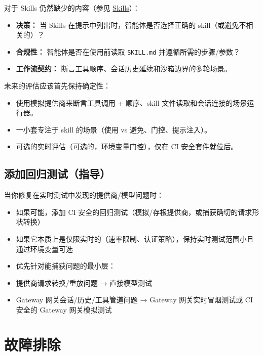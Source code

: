对于 Skills 仍然缺少的内容（参见 \href{/tools/skills}{Skills}）：

\begin{itemize}
  \item \textbf{决策：} 当 Skills 在提示中列出时，智能体是否选择正确的 skill（或避免不相关的）？
  \item \textbf{合规性：} 智能体是否在使用前读取 \texttt{SKILL.md} 并遵循所需的步骤/参数？
  \item \textbf{工作流契约：} 断言工具顺序、会话历史延续和沙箱边界的多轮场景。
\end{itemize}


未来的评估应该首先保持确定性：

\begin{itemize}
  \item 使用模拟提供商来断言工具调用 + 顺序、skill 文件读取和会话连接的场景运行器。
  \item 一小套专注于 skill 的场景（使用 vs 避免、门控、提示注入）。
  \item 可选的实时评估（可选的，环境变量门控），仅在 CI 安全套件就位后。
\end{itemize}


\subsection{添加回归测试（指导）}


当你修复在实时测试中发现的提供商/模型问题时：

\begin{itemize}
  \item 如果可能，添加 CI 安全的回归测试（模拟/存根提供商，或捕获确切的请求形状转换）
  \item 如果它本质上是仅限实时的（速率限制、认证策略），保持实时测试范围小且通过环境变量可选
  \item 优先针对能捕获问题的最小层：
  \item 提供商请求转换/重放问题 → 直接模型测试
  \item Gateway 网关会话/历史/工具管道问题 → Gateway 网关实时冒烟测试或 CI 安全的 Gateway 网关模拟测试
\end{itemize}



\clearpage

\section{故障排除}


